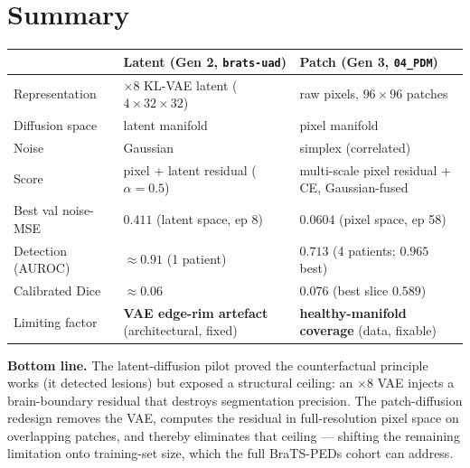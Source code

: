 \documentclass[11pt,a4paper]{article}
\newcommand{\code}[1]{\texttt{\small #1}}
\begin{document}
\section{Summary}
\begin{longtable}{@{}p{}p{}p{}@{}}
\toprule
& \textbf{Latent (Gen 2, \code{brats-uad})} & \textbf{Patch (Gen 3, \code{04\_PDM})} \\
\midrule
Representation     & $\times8$ KL-VAE latent ($4{\times}32{\times}32$) & raw pixels, $96{\times}96$ patches \\
Diffusion space    & latent manifold & pixel manifold \\
Noise              & Gaussian & simplex (correlated) \\
Score              & pixel + latent residual ($\alpha{=}0.5$) & multi-scale pixel residual + CE, Gaussian-fused \\
Best val noise-MSE & $0.411$ (latent space, ep 8) & $0.0604$ (pixel space, ep 58) \\
Detection (AUROC)  & $\approx0.91$ (1 patient) & $0.713$ (4 patients; $0.965$ best) \\
Calibrated Dice    & $\approx0.06$ & $0.076$ (best slice $0.589$) \\
Limiting factor    & \textbf{VAE edge-rim artefact} (architectural, fixed) & \textbf{healthy-manifold coverage} (data, fixable) \\
\bottomrule
\end{longtable}

\noindent
\textbf{Bottom line.} The latent-diffusion pilot proved the counterfactual
principle works (it detected lesions) but exposed a structural ceiling: an
$\times8$ VAE injects a brain-boundary residual that destroys segmentation
precision. The patch-diffusion redesign removes the VAE, computes the residual in
full-resolution pixel space on overlapping patches, and thereby eliminates that
ceiling --- shifting the remaining limitation onto training-set size, which the
full BraTS-PEDs cohort can address.
\end{document}
